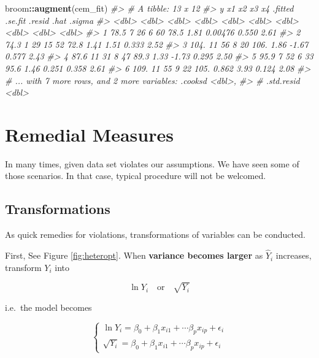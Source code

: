 \documentclass[]{book}
\newenvironment{Shaded}{\begin{snugshade}}{\end{snugshade}}
\newcommand{\CommentTok}[1]{\textcolor[rgb]{0.56,0.35,0.01}{\textit{#1}}}
\newcommand{\KeywordTok}[1]{\textcolor[rgb]{0.13,0.29,0.53}{\textbf{#1}}}
\newcommand{\NormalTok}[1]{#1}
\newcommand{\OperatorTok}[1]{\textcolor[rgb]{0.81,0.36,0.00}{\textbf{#1}}}
\theoremstyle{definition}
\theoremstyle{definition}
\theoremstyle{definition}
\theoremstyle{remark}
\begin{document}
\begin{Shaded}
\begin{Highlighting}[]
\NormalTok{broom}\OperatorTok{::}\KeywordTok{augment}\NormalTok{(cem_fit)}
\CommentTok{#> # A tibble: 13 x 12}
\CommentTok{#>       y    x1    x2    x3    x4 .fitted .se.fit   .resid  .hat .sigma}
\CommentTok{#>   <dbl> <dbl> <dbl> <dbl> <dbl>   <dbl>   <dbl>    <dbl> <dbl>  <dbl>}
\CommentTok{#> 1  78.5     7    26     6    60    78.5   1.81   0.00476 0.550   2.61}
\CommentTok{#> 2  74.3     1    29    15    52    72.8   1.41   1.51    0.333   2.52}
\CommentTok{#> 3 104.     11    56     8    20   106.    1.86  -1.67    0.577   2.43}
\CommentTok{#> 4  87.6    11    31     8    47    89.3   1.33  -1.73    0.295   2.50}
\CommentTok{#> 5  95.9     7    52     6    33    95.6   1.46   0.251   0.358   2.61}
\CommentTok{#> 6 109.     11    55     9    22   105.    0.862  3.93    0.124   2.08}
\CommentTok{#> # ... with 7 more rows, and 2 more variables: .cooksd <dbl>,}
\CommentTok{#> #   .std.resid <dbl>}
\end{Highlighting}
\end{Shaded}

\hypertarget{remedial-measures}{%
\section{Remedial Measures}\label{remedial-measures}}

In many times, given data set violates our assumptions. We have seen some of those scenarios. In that case, typical procedure will not be welcomed.

\hypertarget{transformations}{%
\subsection{Transformations}\label{transformations}}

As quick remedies for violations, transformations of variables can be conducted.

First, See Figure \ref{fig:heteropt}. When \textbf{variance becomes larger} as \(\hat{Y}_i\) increases, transform \(Y_i\) into

\[\ln Y_i \quad \text{or} \quad \sqrt{Y_i}\]

i.e.~the model becomes

\[
\begin{cases}
\ln Y_i = \beta_0 + \beta_1 x_{i1} + \cdots \beta_p x_{ip} + \epsilon_i \\
\sqrt{Y_i} = \beta_0 + \beta_1 x_{i1} + \cdots \beta_p x_{ip} + \epsilon_i
\end{cases}
\]
\end{document}
